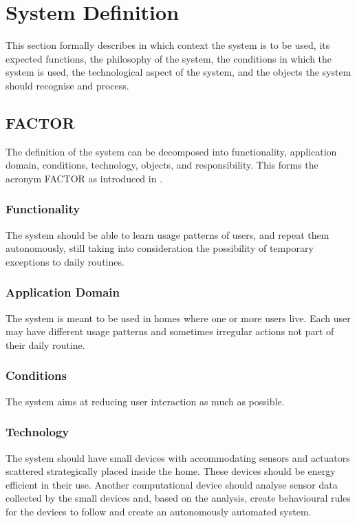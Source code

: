 \section{System Definition}\label{sec:systemDefinition}

This section formally describes in which context the system is to be used, its
expected functions, the philosophy of the system, the conditions in which the
system is used, the technological aspect of the system, and the objects the
system should recognise and process.

\subsection{FACTOR}

The definition of the system can be decomposed into functionality, application
domain, conditions, technology, objects, and responsibility. This forms the
acronym FACTOR as introduced in \cite{mathiassen2001objektorienteret}.

\subsubsection{Functionality}

The system should be able to learn usage patterns of users, and repeat them autonomously, still taking into consideration the possibility of temporary exceptions to daily routines.

\subsubsection{Application Domain}

The system is meant to be used in homes where one or more users live. Each user may
have different usage patterns and sometimes irregular actions not part of their
daily routine.

\subsubsection{Conditions}

The system aims at reducing user interaction as much as possible.

\subsubsection{Technology}

The system should have small devices with accommodating sensors and actuators scattered strategically placed inside the home.
These devices should be energy efficient in their use. Another computational
device should analyse sensor data collected by the small devices and, based on
the analysis, create behavioural rules for the devices to follow and create an autonomously automated system.

